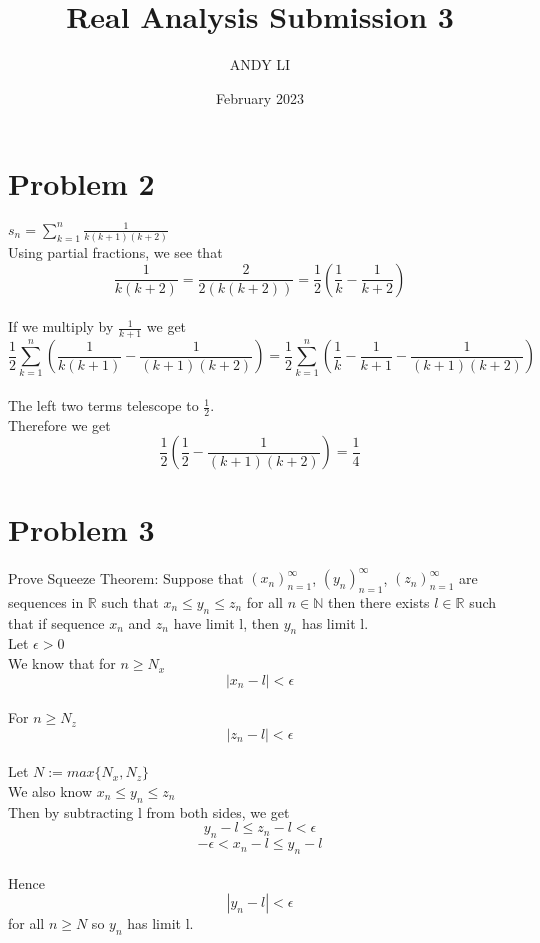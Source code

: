 \documentclass{article}
\title{Real Analysis Submission 3}
\author{ANDY LI}
\date{February 2023}
\begin{document}
\maketitle
\section*{Problem 2}
$s_n = \sum_{k=1}^{n} \frac{1}{k(k+1)(k+2)}$
\\Using partial fractions, we see that $$\frac{1}{k(k+2)} = \frac{2}{2(k(k+2))} = \frac{1}{2}(\frac{1}{k} - \frac{1}{k+2})$$
\\If we multiply by $\frac{1}{k+1}$ we get $$\frac{1}{2} \sum_{k=1}^{n}(\frac{1}{k(k+1)} - \frac{1}{(k+1)(k+2)}) = \frac{1}{2} \sum_{k=1}^{n}(\frac{1}{k} - \frac{1}{k+1} - \frac{1}{(k+1)(k+2)}) $$
\\The left two terms telescope to $\frac{1}{2}$.
\\Therefore we get $$\frac{1}{2}(\frac{1}{2} - \frac{1}{(k+1)(k+2)}) = \frac{1}{4}$$

\section*{Problem 3}
Prove Squeeze Theorem: Suppose that $(x_n)_{n=1}^{\infty}$, $(y_n)_{n=1}^{\infty}$, $(z_n)_{n=1}^{\infty}$ are sequences in $\mathbb{R}$ such that $x_n \leq y_n \leq z_n$ for all $n \in \mathbb{N}$ then there exists $l \in \mathbb{R}$ such that if sequence $x_n$ and $z_n$ have limit l, then $y_n$ has limit l.
\\Let $\epsilon > 0$
\\We know that for $n \geq N_x$ $$|x_n - l| < \epsilon$$
\\For $n \geq N_z$ $$|z_n - l| < \epsilon$$
\\Let $N := max\{N_x, N_z\}$
\\We also know $x_n \leq y_n \leq z_n$
\\Then by subtracting l from both sides, we get $$y_n - l \leq z_n - l < \epsilon$$
$$-\epsilon < x_n - l \leq y_n - l$$
\\Hence $$|y_n - l| < \epsilon$$ for all $n \geq N$ so $y_n$ has limit l.
\end{document}
